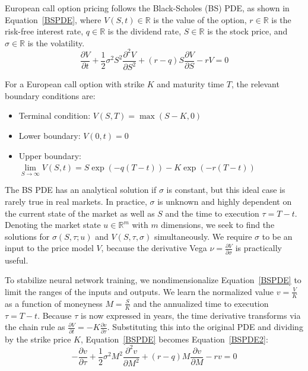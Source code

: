 \documentclass[a4paper,fleqn]{cas-sc}
\begin{document}
European call option pricing follows the Black-Scholes (BS) PDE, as shown in Equation~\ref{BSPDE}, where $V(S,t)\in\mathbb{R}$ is the value of the option, $r\in\mathbb{R}$ is the risk-free interest rate, $q\in\mathbb{R}$ is the dividend rate, $S\in\mathbb{R}$ is the stock price, and $\sigma\in\mathbb{R}$ is the volatility. 
\begin{equation}
\frac{\partial V}{\partial t} + \frac{1}{2} \sigma^2 S^2\frac{\partial^2 V}{\partial S^2} + (r-q)S\frac{\partial V}{\partial S} - rV = 0 \label{BSPDE}
\end{equation}

For a European call option with strike $K$ and maturity time $T$, the relevant boundary conditions are:
\begin{itemize}[nosep]
    \item Terminal condition: $V(S,T)=\max(S-K,0)$
    \item Lower boundary: $V(0,t)=0$
    \item Upper boundary: $\lim\limits_{S\rightarrow\infty} V(S,t)=S\exp(-q(T-t))-K\exp(-r(T-t))$
\end{itemize}

The BS PDE has an analytical solution if $\sigma$ is constant, but this ideal case is rarely true in real markets. In practice, $\sigma$ is unknown and highly dependent on the current state of the market as well as $S$ and the time to execution $\tau = T-t$. Denoting the market state $u\in\mathbb{R}^m$ with $m$ dimensions, we seek to find the solutions for $\sigma(S,\tau;u)$ and $V(S,\tau,\sigma)$ simultaneously. We require $\sigma$ to be an input to the price model $V$, because the derivative Vega $\nu = \frac{\partial V}{\partial \sigma}$ is practically useful. 

To stabilize neural network training, we nondimensionalize Equation~\ref{BSPDE} to limit the ranges of the inputs and outputs. We learn the normalized value $v = \frac{V}{K}$ as a function of moneyness $M=\frac{S}{K}$ and the annualized time to execution $\tau=T-t$. Because $\tau$ is now expressed in years, the time derivative transforms via the chain rule as $\frac{\partial V}{\partial t} = -K \frac{\partial v}{\partial \tau}$. Substituting this into the original PDE and dividing by the strike price $K$, Equation~\ref{BSPDE} becomes Equation~\ref{BSPDE2}:
\begin{equation}
-\frac{\partial v}{\partial \tau} + \frac{1}{2}\sigma^2 M^2 \frac{\partial^2 v}{\partial M^2} + (r-q)M\frac{\partial v}{\partial M} - rv = 0 \label{BSPDE2}
\end{equation}
\end{document}
